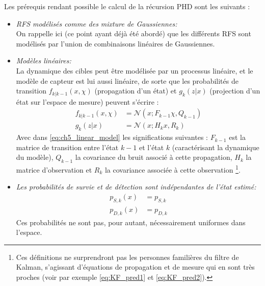 Les prérequis rendant possible le calcul de la récursion PHD sont les suivants :

\begin{itemize}
	\item{\emph{RFS modélisés comme des mixture de Gaussiennes:}\\}
	On rappelle ici (ce point ayant déjà été abordé) que les différents RFS sont modélisés par l'union de combinaisons linéaires de Gaussiennes.\\

	\item{\emph{Modèles linéaires:}\\}
	La dynamique des cibles peut être modélisée par un processus linéaire, et le modèle de capteur est lui aussi linéaire, de sorte que les probabilités de transition $f_{k|k-1}(x, \chi)$ (propagation d'un état) et $g_k(z|x)$ (projection d'un état sur l'espace de mesure) peuvent s'écrire :
	\begin{align} \label{eq:ch5_linear_model}
		f_{k|k-1}(x, \chi) 	&= \mathcal{N}(x; F_{k-1}\chi, Q_{k-1}) \\
		g_k(z|x) 						&= \mathcal{N}(x; H_{k} x, R_{k})
	\end{align}
	Avec dans \ref{eq:ch5_linear_model} les significations suivantes : $F_{k-1}$ est la matrice de transition entre l'état $k-1$ et l'état $k$ (caractérisant la dynamique du modèle), $Q_{k-1}$ la covariance du bruit associé à cette propagation, $H_k$ la matrice d'observation et $R_k$ la covariance associée à cette observation \footnote{Ces définitions ne surprendront pas les personnes familières du filtre de Kalman, s'agissant d'équations de propagation et de mesure qui en sont très proches (voir par exemple \ref{eq:KF_pred1} et  \ref{eq:KF_pred2}).}.\\
	
	\item{\emph{Les probabilités de survie et de détection sont indépendantes de l'état estimé:}}
	\begin{align}
		p_{S,k}(x) &= p_{S,k} \\
		p_{D,k}(x) &= p_{D,k} 
	\end{align}
	Ces probabilités ne sont pas, pour autant, nécessairement uniformes dans l'espace.\\
	

\end{itemize}
